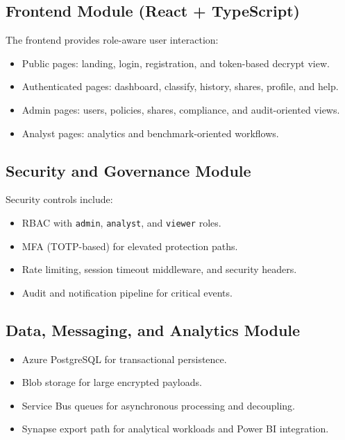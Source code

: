 \documentclass[12pt,a4paper]{article}
\begin{document}
\subsection{Frontend Module (React + TypeScript)}

The frontend provides role-aware user interaction:

\begin{itemize}[leftmargin=1.4em]
  \item Public pages: landing, login, registration, and token-based decrypt view.
  \item Authenticated pages: dashboard, classify, history, shares, profile, and help.
  \item Admin pages: users, policies, shares, compliance, and audit-oriented views.
  \item Analyst pages: analytics and benchmark-oriented workflows.
\end{itemize}

\subsection{Security and Governance Module}

Security controls include:

\begin{itemize}[leftmargin=1.4em]
  \item RBAC with \texttt{admin}, \texttt{analyst}, and \texttt{viewer} roles.
  \item MFA (TOTP-based) for elevated protection paths.
  \item Rate limiting, session timeout middleware, and security headers.
  \item Audit and notification pipeline for critical events.
\end{itemize}

\subsection{Data, Messaging, and Analytics Module}

\begin{itemize}[leftmargin=1.4em]
  \item Azure PostgreSQL for transactional persistence.
  \item Blob storage for large encrypted payloads.
  \item Service Bus queues for asynchronous processing and decoupling.
  \item Synapse export path for analytical workloads and Power BI integration.
\end{itemize}
\end{document}
